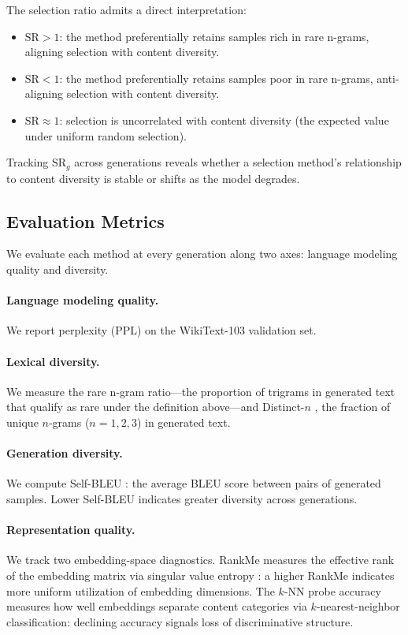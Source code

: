 The selection ratio admits a direct interpretation:
\begin{itemize}
    \item $\text{SR} > 1$: the method preferentially retains samples rich in rare n-grams, aligning selection with content diversity.
    \item $\text{SR} < 1$: the method preferentially retains samples poor in rare n-grams, anti-aligning selection with content diversity.
    \item $\text{SR} \approx 1$: selection is uncorrelated with content diversity (the expected value under uniform random selection).
\end{itemize}

\noindent Tracking $\text{SR}_g$ across generations reveals whether a selection method's relationship to content diversity is stable or shifts as the model degrades.

\subsection{Evaluation Metrics}

We evaluate each method at every generation along two axes: language modeling quality and diversity.

\paragraph{Language modeling quality.} We report perplexity (PPL) on the WikiText-103 validation set.

\paragraph{Lexical diversity.} We measure the rare n-gram ratio---the proportion of trigrams in generated text that qualify as rare under the definition above---and Distinct-$n$ \citep{li2016diversity}, the fraction of unique $n$-grams ($n = 1, 2, 3$) in generated text.

\paragraph{Generation diversity.} We compute Self-BLEU \citep{zhu2018texygen}: the average BLEU score between pairs of generated samples. Lower Self-BLEU indicates greater diversity across generations.

\paragraph{Representation quality.} We track two embedding-space diagnostics. RankMe measures the effective rank of the embedding matrix via singular value entropy \citep{jing2022understanding}: a higher RankMe indicates more uniform utilization of embedding dimensions. The $k$-NN probe accuracy measures how well embeddings separate content categories via $k$-nearest-neighbor classification: declining accuracy signals loss of discriminative structure.


